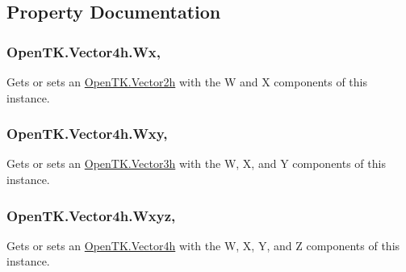 \subsection{Property Documentation}
\hypertarget{struct_open_t_k_1_1_vector4h_a7ec34caec68e8ebeb92b6971dcc84803}{
\subsubsection[{Wx}]{ Open\-T\-K.\-Vector4h.\-Wx\hspace{0.3cm}{\ttfamily [get]}, {\ttfamily [set]}}}\label{struct_open_t_k_1_1_vector4h_a7ec34caec68e8ebeb92b6971dcc84803}


Gets or sets an \hyperlink{struct_open_t_k_1_1_vector2h}{Open\-T\-K.\-Vector2h} with the W and X components of this instance. 

\hypertarget{struct_open_t_k_1_1_vector4h_a9df517991a150c7fa71ff65e35687609}{
\subsubsection[{Wxy}]{ Open\-T\-K.\-Vector4h.\-Wxy\hspace{0.3cm}{\ttfamily [get]}, {\ttfamily [set]}}}\label{struct_open_t_k_1_1_vector4h_a9df517991a150c7fa71ff65e35687609}


Gets or sets an \hyperlink{struct_open_t_k_1_1_vector3h}{Open\-T\-K.\-Vector3h} with the W, X, and Y components of this instance. 

\hypertarget{struct_open_t_k_1_1_vector4h_ae6ad5e7e9762cfa70bb7abf72b37cc6e}{
\subsubsection[{Wxyz}]{ Open\-T\-K.\-Vector4h.\-Wxyz\hspace{0.3cm}{\ttfamily [get]}, {\ttfamily [set]}}}\label{struct_open_t_k_1_1_vector4h_ae6ad5e7e9762cfa70bb7abf72b37cc6e}


Gets or sets an \hyperlink{struct_open_t_k_1_1_vector4h}{Open\-T\-K.\-Vector4h} with the W, X, Y, and Z components of this instance. 


